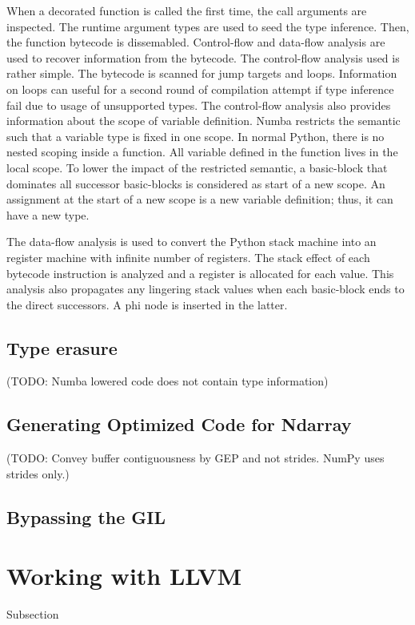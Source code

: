 \documentclass{acm_proc_article-sp}
\begin{document}
When a decorated function is called the first time, the call arguments are
inspected. The runtime argument types are used to seed the type inference.
Then, the function bytecode is dissemabled.  Control-flow and data-flow analysis
are used to recover information from the bytecode.
The control-flow analysis used is rather simple.
The bytecode is scanned for jump targets and loops. Information on loops
can useful for a second round of compilation attempt if type inference fail
due to usage of unsupported types.  The control-flow analysis also provides
information about the scope of variable definition.
Numba restricts the semantic such that a variable type is fixed in one scope.
In normal Python, there is no nested scoping inside a function.
All variable defined in the function lives in the local scope.
To lower the impact of the restricted semantic, a basic-block that dominates
all successor basic-blocks is considered as start of a new scope.
An assignment at the start of a new scope is a new variable definition; thus,
it can have a new type.

The data-flow analysis is used to convert the Python stack machine into an
register machine with infinite number of registers.
The stack effect of each bytecode instruction is analyzed and a register is
allocated for each value.  This analysis also propagates any lingering stack
values when each basic-block ends to the direct successors.
A phi node is inserted in the latter.





\subsection{Type erasure}

(TODO: Numba lowered code does not contain type information)

\subsection{Generating Optimized Code for Ndarray}

(TODO: Convey buffer contiguousness by GEP and not strides.
NumPy uses strides only.)

\subsection{Bypassing the GIL}

\section{Working with LLVM}
Subsection
\end{document}
